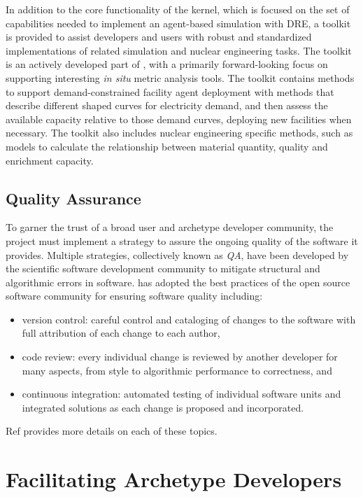 In addition to the core functionality of the \Cyclus kernel, which is focused
on the set of capabilities needed to implement an agent-based simulation with
\gls{DRE}, a toolkit is provided to assist developers and users with robust
and standardized implementations of related simulation and nuclear engineering
tasks. The toolkit is an actively developed part of \Cyclus, with a primarily
forward-looking focus on supporting interesting \textit{in situ} metric
analysis tools.  The toolkit contains methods to support demand-constrained
facility agent deployment with methods that describe different shaped curves
for electricity demand, and then assess the available capacity relative to
those demand curves, deploying new facilities when necessary.  The toolkit
also includes nuclear engineering specific methods, such as models to
calculate the relationship between material quantity, quality and enrichment
capacity.

\subsection{Quality Assurance}

To garner the trust of a broad user and archetype developer community, the
\Cyclus project must implement a strategy to assure the ongoing quality of the
software it provides.  Multiple strategies, collectively known as
\emph{\gls{QA}}, have been developed by the scientific software development
community to mitigate structural and algorithmic errors in software.  \Cyclus
has adopted the best practices of the open source software community for
ensuring software quality including:
\begin{itemize}
\item version control: careful control and cataloging of changes to the
  software with full attribution of each change to each author,
\item code review: every individual change is reviewed by another developer
  for many aspects, from style to algorithmic performance to correctness, and
\item continuous integration: automated testing of individual software units
  and integrated solutions as each change is proposed and incorporated.
\end{itemize}
Ref  provides more details on each of these topics.


\section{Facilitating Archetype Developers} %
\label{sec:archetypes}

